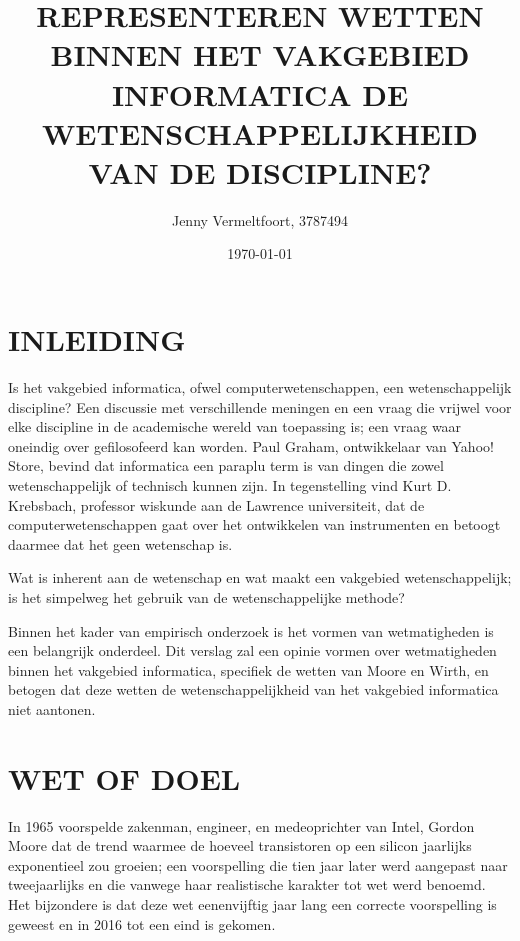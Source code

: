 \documentclass[a4paper,11pt]{article}
\begin{document}
\title{REPRESENTEREN WETTEN BINNEN HET VAKGEBIED INFORMATICA DE WETENSCHAPPELIJKHEID VAN DE DISCIPLINE?}
\author{Jenny Vermeltfoort, 3787494}
\date{\today}
\maketitle

\sectionfont{\centering\MakeUppercase}
\linenumbers

\section*{INLEIDING}
Is het vakgebied informatica, ofwel computerwetenschappen, een wetenschappelijk discipline? Een discussie met
verschillende meningen en een vraag die vrijwel voor elke discipline in de academische wereld van toepassing is;
een
vraag waar oneindig over gefilosofeerd kan worden. Paul Graham, ontwikkelaar van Yahoo! Store, bevind dat
informatica
een paraplu term is van dingen die zowel wetenschappelijk of technisch kunnen
zijn\cite[p~29]{denningComputerScienceScience2005}.  In tegenstelling
vind
Kurt D. Krebsbach, professor wiskunde aan de Lawrence universiteit, dat de computerwetenschappen gaat over het
ontwikkelen van instrumenten en betoogt daarmee dat het geen wetenschap is\cite{krebsbachComputerScienceNot2015}.

Wat is inherent aan de wetenschap en wat maakt een vakgebied wetenschappelijk; is het simpelweg het gebruik van de
wetenschappelijke methode?

Binnen het kader van empirisch onderzoek is het vormen van wetmatigheden is een belangrijk onderdeel.
Dit
verslag zal een opinie vormen over wetmatigheden binnen het vakgebied informatica, specifiek de wetten van Moore en
Wirth, en betogen dat deze wetten de wetenschappelijkheid van het vakgebied informatica niet aantonen.
\section*{WET OF DOEL}
In 1965 voorspelde zakenman, engineer, en medeoprichter van Intel, Gordon Moore dat de trend waarmee de hoeveel
transistoren op een silicon jaarlijks exponentieel zou groeien; een voorspelling die tien jaar later werd aangepast
naar tweejaarlijks en die vanwege haar realistische karakter tot wet werd benoemd. Het bijzondere is dat deze wet
eenenvijftig jaar lang een correcte voorspelling is geweest en in 2016 tot een eind is
gekomen\cite[p~1]{leisersonTherePlentyRoom2020}.
\end{document}
